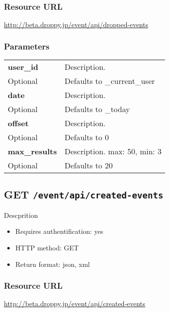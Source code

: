 \documentclass[11pt,a4paper]{article}
\newcommand{\content}[1]{\begin{minipage}{10cm}\vspace{2mm}#1\vspace{2mm}\end{minipage}}
\begin{document}
  \subsubsection*{Resource URL}
  \url{http://beta.droppy.jp/event/api/dropped-events}
  \subsubsection*{Parameters}
  \begin{table}[h]
    \begin{center}
      \begin{tabular}{l l}
        \hline 
      \textbf{user\_id} & \content{Description. }
      \\
      Optional & Defaults to \_current\_user\\
      \hline
      \textbf{date} & \content{Description. }
      \\
      Optional & Defaults to \_today\\
      \hline
      \textbf{offset} & \content{Description. }
      \\
      Optional & Defaults to 0\\
      \hline
      \textbf{max\_results} & \content{Description. max: 50, min: 3}
      \\
      Optional & Defaults to 20\\
      \hline
      \end{tabular}
    \end{center}
  \end{table}
  
      \newpage
      
      
  \subsection*{GET {\tt /event/api/created-events}}
  Descprition
  \begin{itemize}
  \item Requires authentification: yes
  \item HTTP method: GET
  \item Return format: json, xml
  \end{itemize}
  \subsubsection*{Resource URL}
  \url{http://beta.droppy.jp/event/api/created-events}
\end{document}
